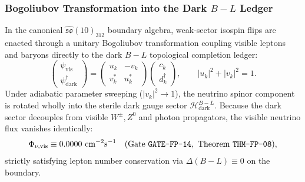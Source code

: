 \documentclass[11pt,onecolumn]{article}
\begin{document}
\subsubsection[Bogoliubov Transformation into the Dark B-L Ledger]{Bogoliubov Transformation into the Dark \texorpdfstring{$B-L$}{B-L} Ledger}
In the canonical $\widehat{\mathfrak{so}}(10)_{312}$ boundary algebra, weak-sector isospin flips are enacted through a unitary Bogoliubov transformation coupling visible leptons and baryons directly to the dark $B-L$ topological completion ledger:
\begin{equation}
\begin{pmatrix} \psi_{\text{vis}} \\ \psi_{\text{dark}}^\dagger \end{pmatrix} = \begin{pmatrix} u_k & -v_k \\ v_k^* & u_k^* \end{pmatrix} \begin{pmatrix} c_k \\ d_k^\dagger \end{pmatrix}, \qquad |u_k|^2 + |v_k|^2 = 1.
\label{eq:weak_bogoliubov}
\end{equation}
Under adiabatic parameter sweeping ($|v_k|^2 \to 1$), the neutrino spinor component is rotated wholly into the sterile dark gauge sector $\mathcal{H}_{\text{dark}}^{B-L}$. Because the dark sector decouples from visible $W^\pm, Z^0$ and photon propagators, the visible neutrino flux vanishes identically:
\begin{equation}
\Phi_{\nu,\text{vis}} \equiv 0.0000~\text{cm}^{-2}\text{s}^{-1} \quad (\text{Gate \texttt{GATE-FP-14}}, \text{ Theorem \texttt{THM-FP-08}}),
\end{equation}
strictly satisfying lepton number conservation via $\Delta(B-L) \equiv 0$ on the boundary.
\end{document}
